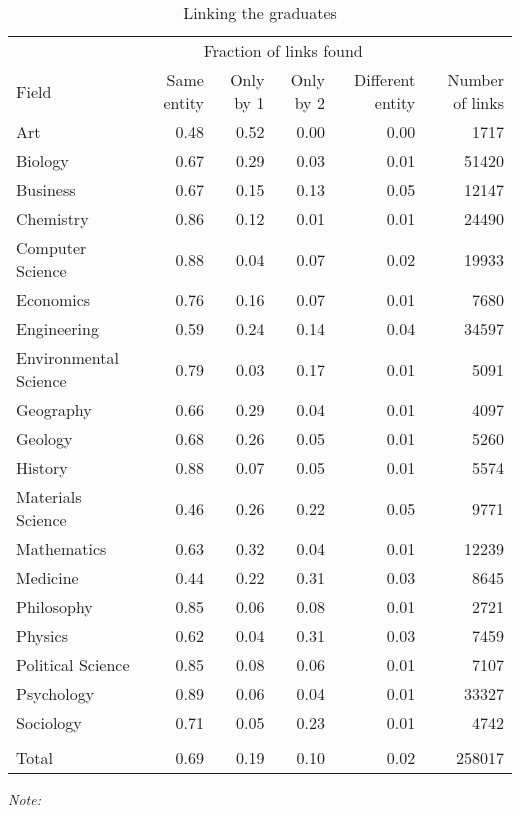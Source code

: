 \begin{table}
\centering
\caption{\label{tab:compare_linking_graduates}Linking the graduates}
\centering
\fontsize{9}{11}\selectfont
\begin{threeparttable}
\begin{tabular}[t]{lrrrrr}
\toprule
\multicolumn{1}{c}{ } & \multicolumn{4}{c}{Fraction of links found} & \multicolumn{1}{c}{ } \\
Field & Same entity & Only by 1 & Only by 2 & Different entity & Number of links\\
\midrule
Art & 0.48 & 0.52 & 0.00 & 0.00 & 1717\\
Biology & 0.67 & 0.29 & 0.03 & 0.01 & 51420\\
Business & 0.67 & 0.15 & 0.13 & 0.05 & 12147\\
Chemistry & 0.86 & 0.12 & 0.01 & 0.01 & 24490\\
Computer Science & 0.88 & 0.04 & 0.07 & 0.02 & 19933\\
\addlinespace
Economics & 0.76 & 0.16 & 0.07 & 0.01 & 7680\\
Engineering & 0.59 & 0.24 & 0.14 & 0.04 & 34597\\
Environmental Science & 0.79 & 0.03 & 0.17 & 0.01 & 5091\\
Geography & 0.66 & 0.29 & 0.04 & 0.01 & 4097\\
Geology & 0.68 & 0.26 & 0.05 & 0.01 & 5260\\
\addlinespace
History & 0.88 & 0.07 & 0.05 & 0.01 & 5574\\
Materials Science & 0.46 & 0.26 & 0.22 & 0.05 & 9771\\
Mathematics & 0.63 & 0.32 & 0.04 & 0.01 & 12239\\
Medicine & 0.44 & 0.22 & 0.31 & 0.03 & 8645\\
Philosophy & 0.85 & 0.06 & 0.08 & 0.01 & 2721\\
\addlinespace
Physics & 0.62 & 0.04 & 0.31 & 0.03 & 7459\\
Political Science & 0.85 & 0.08 & 0.06 & 0.01 & 7107\\
Psychology & 0.89 & 0.06 & 0.04 & 0.01 & 33327\\
Sociology & 0.71 & 0.05 & 0.23 & 0.01 & 4742\\
\midrule\\
Total & 0.69 & 0.19 & 0.10 & 0.02 & 258017\\
\bottomrule
\end{tabular}
\begin{tablenotes}[para]
\small
\item \textit{Note: } 

\end{tablenotes}
\end{threeparttable}
\end{table}
